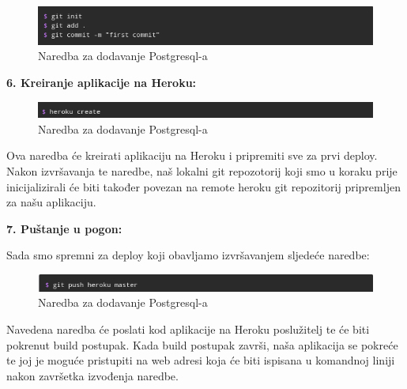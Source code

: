 		\begin{figure}[H]
			\includegraphics[scale=0.8]{slike/herokuInit.png} %
			\centering
			\caption { Naredba za dodavanje Postgresql-a}
			\label{fig:5.2}
		\end{figure}

	\noindent\textbf{6. Kreiranje aplikacije na Heroku:}

		\begin{figure}[H]
			\includegraphics[scale=0.8]{slike/herokuCreate.png} %
			\centering
			\caption { Naredba za dodavanje Postgresql-a}
			\label{fig:5.2}
		\end{figure}
	
	Ova naredba će kreirati aplikaciju na Heroku i pripremiti sve za prvi deploy. Nakon izvršavanja te naredbe, naš lokalni git repozotorij koji smo u koraku prije inicijalizirali će biti također povezan na remote heroku git repozitorij pripremljen za našu aplikaciju.
	
	\bigskip
	
	\noindent\textbf{7. Puštanje u pogon:}
	
	Sada smo spremni za deploy koji obavljamo izvršavanjem sljedeće naredbe: 
	
	\begin{figure}[H]
		\includegraphics[scale=0.8]{slike/herokuPush.png} %
		\centering
		\caption { Naredba za dodavanje Postgresql-a}
		\label{fig:5.2}
	\end{figure}

	Navedena naredba će poslati kod aplikacije na Heroku poslužitelj te će biti pokrenut build postupak. Kada build postupak završi, naša aplikacija se pokreće te joj je moguće pristupiti na web adresi koja će biti ispisana u komandnoj liniji nakon završetka izvođenja naredbe.

